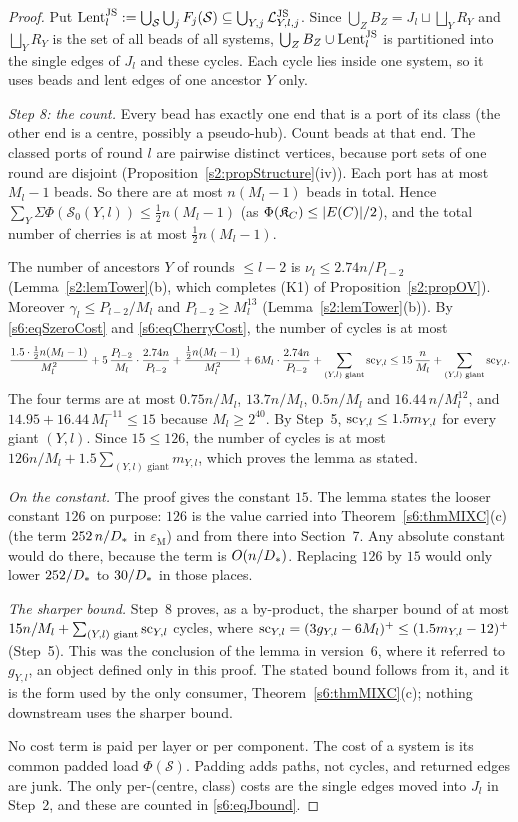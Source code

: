 \begin{proof}
Put $\mathrm{Lent}^{\mathrm{JS}}_l:=\bigcup_{\mathcal S}\bigcup_jF_j(\mathcal S)\subseteq\bigcup_{Y,j}\mathcal{L}^{\mathrm{JS}}_{Y,l,j}$. Since $\bigcup_ZB_Z=J_l\sqcup\bigsqcup_YR_Y$ and $\bigsqcup_YR_Y$ is the set of all beads of all systems, $\bigcup_ZB_Z\cup\mathrm{Lent}^{\mathrm{JS}}_l$ is partitioned into the single edges of $J_l$ and these cycles. Each cycle lies inside one system, so it uses beads and lent edges of one ancestor $Y$ only.

\emph{Step 8: the count.} Every bead has exactly one end that is a port of its class (the other end is a centre, possibly a pseudo-hub). Count beads at that end. The classed ports of round $l$ are pairwise distinct vertices, because port sets of one round are disjoint (Proposition~\ref{s2:propStructure}(iv)). Each port has at most $M_l-1$ beads. So there are at most $n(M_l-1)$ beads in total. Hence $\sum_Y\Sigma\Phi(\mathcal S_0(Y,l))\le\frac12n(M_l-1)$ (as $\Phi(\mathfrak{K}_C)\le|E(C)|/2$), and the total number of cherries is at most $\frac12n(M_l-1)$.

The number of ancestors $Y$ of rounds $\le l-2$ is $\nu_l\le2.74n/P_{l-2}$ (Lemma~\ref{s2:lemTower}(b), which completes (K1) of Proposition~\ref{s2:propOV}). Moreover $\gamma_l\le P_{l-2}/M_l$ and $P_{l-2}\ge M_l^{13}$ (Lemma~\ref{s2:lemTower}(b)). By \eqref{s6:eqSzeroCost} and \eqref{s6:eqCherryCost}, the number of cycles is at most
\[
\frac{1.5\cdot\frac12n(M_l-1)}{M_l^2}+5\,\frac{P_{l-2}}{M_l}\cdot\frac{2.74n}{P_{l-2}}+\frac{\frac12n(M_l-1)}{M_l^2}+6M_l\cdot\frac{2.74n}{P_{l-2}}+\sum_{(Y,l)\text{ giant}}\mathrm{sc}_{Y,l}
\le15\,\frac n{M_l}+\sum_{(Y,l)\text{ giant}}\mathrm{sc}_{Y,l}.
\]
The four terms are at most $0.75n/M_l$, $13.7n/M_l$, $0.5n/M_l$ and $16.44\,n/M_l^{12}$, and $14.95+16.44\,M_l^{-11}\le15$ because $M_l\ge2^{40}$. By Step~5, $\mathrm{sc}_{Y,l}\le1.5m_{Y,l}$ for every giant $(Y,l)$. Since $15\le126$, the number of cycles is at most $126n/M_l+1.5\sum_{(Y,l)\text{ giant}}m_{Y,l}$, which proves the lemma as stated.

\emph{On the constant.} The proof gives the constant $15$. The lemma states the looser constant $126$ on purpose: $126$ is the value carried into Theorem~\ref{s6:thmMIXC}(c) (the term $252\,n/D_{*}$ in $\varepsilon_{\mathrm M}$) and from there into Section~7. Any absolute constant would do there, because the term is $O(n/D_{*})$. Replacing $126$ by $15$ would only lower $252/D_{*}$ to $30/D_{*}$ in those places.

\emph{The sharper bound.} Step~8 proves, as a by-product, the sharper bound of at most $15n/M_l+\sum_{(Y,l)\text{ giant}}\mathrm{sc}_{Y,l}$ cycles, where $\mathrm{sc}_{Y,l}=(3g_{Y,l}-6M_l)^+\le(1.5m_{Y,l}-12)^+$ (Step~5). This was the conclusion of the lemma in version~6, where it referred to $g_{Y,l}$, an object defined only in this proof. The stated bound follows from it, and it is the form used by the only consumer, Theorem~\ref{s6:thmMIXC}(c); nothing downstream uses the sharper bound.

No cost term is paid per layer or per component. The cost of a system is its common padded load $\Phi(\mathcal S)$. Padding adds paths, not cycles, and returned edges are junk. The only per-(centre, class) costs are the single edges moved into $J_l$ in Step~2, and these are counted in \eqref{s6:eqJbound}.
\end{proof}

